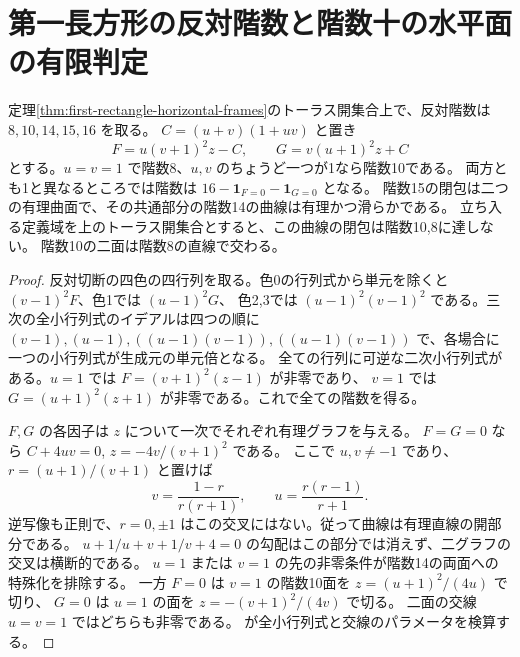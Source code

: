 \section{第一長方形の反対階数と階数十の水平面の有限判定}
\label{sec:first-rectangle-rank-strata}
\begin{theorem}\label{thm:first-rectangle-rank-strata}
定理\ref{thm:first-rectangle-horizontal-frames}のトーラス開集合上で、反対階数は $8,10,14,15,16$ を取る。
$C=(u+v)(1+uv)$ と置き
\[
 F=u(v+1)^2z-C,\qquad G=v(u+1)^2z+C
\]
とする。$u=v=1$ で階数8、$u,v$ のちょうど一つが1なら階数10である。
両方とも1と異なるところでは階数は $16-\mathbf1_{F=0}-\mathbf1_{G=0}$ となる。
階数15の閉包は二つの有理曲面で、その共通部分の階数14の曲線は有理かつ滑らかである。
立ち入る定義域を上のトーラス開集合とすると、この曲線の閉包は階数10,8に達しない。
階数10の二面は階数8の直線で交わる。
\end{theorem}
\begin{proof}
反対切断の四色の四行列を取る。色0の行列式から単元を除くと $(v-1)^2F$、色1では $(u-1)^2G$、
色2,3では $(u-1)^2(v-1)^2$ である。三次の全小行列式のイデアルは四つの順に
$(v-1),(u-1),((u-1)(v-1)),((u-1)(v-1))$ で、各場合に一つの小行列式が生成元の単元倍となる。
全ての行列に可逆な二次小行列式がある。$u=1$ では $F=(v+1)^2(z-1)$ が非零であり、
$v=1$ では $G=(u+1)^2(z+1)$ が非零である。これで全ての階数を得る。

$F,G$ の各因子は $z$ について一次でそれぞれ有理グラフを与える。
$F=G=0$ なら $C+4uv=0$, $z=-4v/(v+1)^2$ である。
ここで $u,v\ne-1$ であり、$r=(u+1)/(v+1)$ と置けば
\[
 v=\frac{1-r}{r(r+1)},\qquad u=\frac{r(r-1)}{r+1}.
\]
逆写像も正則で、$r=0,\pm1$ はこの交叉にはない。従って曲線は有理直線の開部分である。
$u+1/u+v+1/v+4=0$ の勾配はこの部分では消えず、二グラフの交叉は横断的である。
$u=1$ または $v=1$ の先の非零条件が階数14の両面への特殊化を排除する。
一方 $F=0$ は $v=1$ の階数10面を $z=(u+1)^2/(4u)$ で切り、
$G=0$ は $u=1$ の面を $z=-(v+1)^2/(4v)$ で切る。
二面の交線 $u=v=1$ ではどちらも非零である。
 が全小行列式と交線のパラメータを検算する。
\end{proof}


